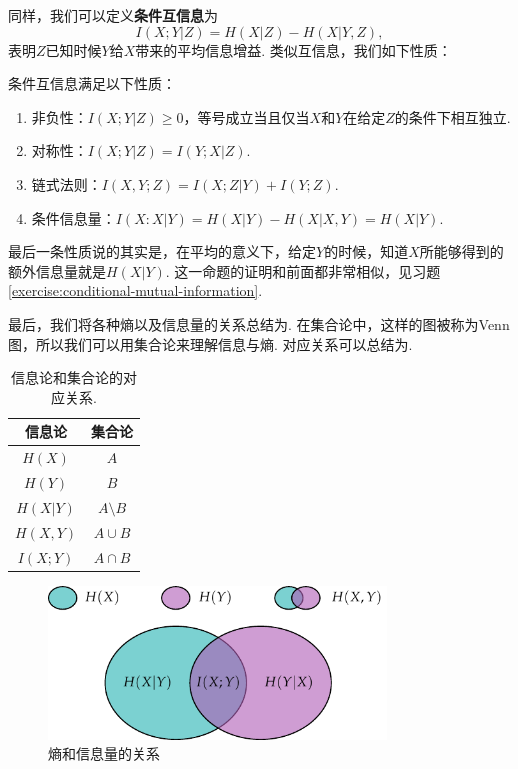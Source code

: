 同样，我们可以定义\textbf{条件互信息}为
\[I(X;Y|Z)=H(X|Z)-H(X|Y,Z),\]
表明$Z$已知时候$Y$给$X$带来的平均信息增益. 类似互信息，我们如下性质：
\begin{proposition}\label{prop:conditional-mutual-information}
    条件互信息满足以下性质：
    \begin{enumerate}
        \item 非负性：$I(X;Y|Z)\geq 0$，等号成立当且仅当$X$和$Y$在给定$Z$的条件下相互独立.
        \item 对称性：$I(X;Y|Z)=I(Y;X|Z)$.
        \item 链式法则：$I(X,Y;Z)=I(X;Z|Y)+I(Y;Z)$.
        \item 条件信息量：$I(X:X|Y)=H(X|Y)-H(X|X,Y)=H(X|Y)$.
    \end{enumerate}
\end{proposition}
最后一条性质说的其实是，在平均的意义下，给定$Y$的时候，知道$X$所能够得到的额外信息量就是$H(X|Y)$. 这一命题的证明和前面都非常相似，见习题 \ref{exercise:conditional-mutual-information}. 

最后，我们将各种熵以及信息量的关系总结为. 在集合论中，这样的图被称为Venn图，所以我们可以用集合论来理解信息与熵. 对应关系可以总结为.
\begin{table}[ht]
    \centering
        \begin{tabular}{c|c}
        \toprule
        信息论&集合论\\
        \midrule
        $H(X)$&$A$\\
        $H(Y)$&$B$\\
        $H(X|Y)$&$A\setminus B$\\
        $H(X,Y)$&$A\cup B$\\
        $I(X;Y)$&$A\cap B$\\
        \bottomrule
        \end{tabular}
    \caption{信息论和集合论的对应关系.}
    \label{tab:entropy-relation}
\end{table}
\begin{figure}[ht]
    \centering
    \includegraphics[width=0.8\textwidth]{figures/information-theory/entropy-relations.pdf}
    \caption{熵和信息量的关系}
    \label{fig:entropy-relation}
\end{figure}

